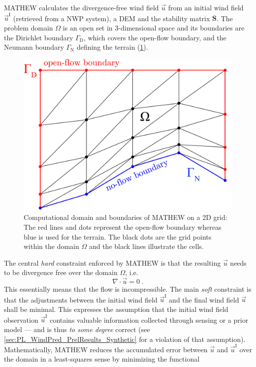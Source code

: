 \documentclass[twocolumn,letterpaper]{IEEEAerospaceCLS}
\newcommand{\matr}[1]{\bm{#1}}
\begin{document}
MATHEW calculates the divergence-free wind field $\vec{u}$ from an initial wind field $\vec{u}^\text{I}$ (retrieved from a NWP system), a \ac{DEM} and the stability matrix $\matr{S}$. The problem domain $\Omega$ is an open set in 3-dimensional space and its boundaries are the Dirichlet boundary $\Gamma_\text{D}$, which covers the open-flow boundary, and the Neumann boundary $\Gamma_\text{N}$ defining the terrain (\cref{fig:PL_WindPred_Fund_Grid2D}). 
	\begin{figure}[b]
	\centering
	\includegraphics[width=0.8\columnwidth]{images/WindPred/Fundamentals/grid.pdf}
	\caption[2D grid]{Computational domain and boundaries of MATHEW on a 2D grid: The red lines and dots represent the open-flow boundary whereas blue is used for the terrain. The black dots are the grid points within the domain $\Omega$ and the black lines illustrate the cells.}
	\label{fig:PL_WindPred_Fund_Grid2D}
	\end{figure}
The central \emph{hard} constraint enforced by MATHEW is that the resulting $\vec{u}$ needs to be divergence free over the domain $\Omega$, i.e.
	\begin{equation}
	\nabla \cdot \vec{u} = 0\; .
	\label{eqn:PL_WindPred_wind_div_free}
	\end{equation}
This essentially means that the flow is incompressible. The main \emph{soft} constraint is that the adjustments between the initial wind field $\vec{u}^\text{I}$ and the final wind field $\vec{u}$ shall be minimal. This expresses the assumption that the initial wind field observation $\vec{u}^\text{I}$ contains valuable information collected through sensing or a prior model --- and is thus \emph{to some degree} correct (see \cref{sec:PL_WindPred_PrelResults_Synthetic} for a violation of that assumption). Mathematically, MATHEW reduces the accumulated error between $\vec{u}$ and $\vec{u}^\text{I}$ over the domain in a least-squares sense by minimizing the functional
\end{document}
